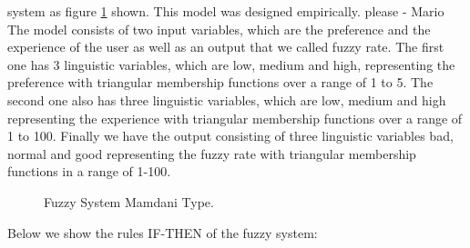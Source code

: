 system \cite{mamdani1975experiment} \cite{mamdani1974application} as figure
\ref{fig:fis01} shown. This model was designed empirically. %
please - Mario The model consists of two input variables, which are the
preference and the experience of the user as well as an output that we called
fuzzy rate. The first one has 3 linguistic variables, which are low, medium and
high, representing the %
preference with triangular membership functions over a range of 1 to 5. The
second one also has three linguistic variables, which are low, medium and high
representing the experience with triangular membership functions over a range of
1 to 100. Finally we have the output consisting of three linguistic variables
bad, normal and good representing the fuzzy rate with triangular membership
functions in a range of 1-100.
\begin{figure}
\captionsetup{justification=centering,margin=2cm}
\centering
\setlength\fboxsep{0pt}
\setlength\fboxrule{0.7pt}
\caption{Fuzzy System Mamdani Type.}
\label{fig:fis01}
\end{figure}

Below we show the rules IF-THEN of the fuzzy system:

